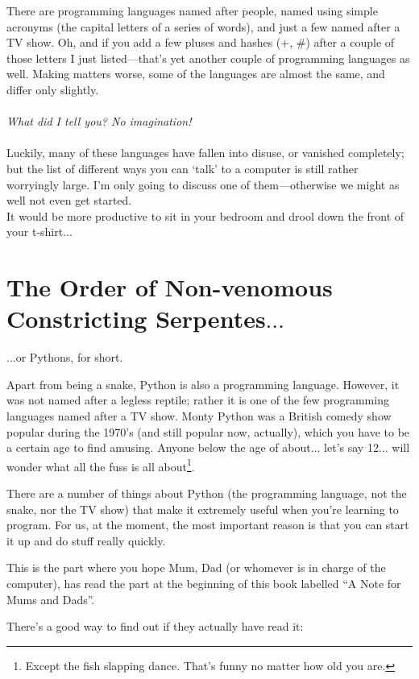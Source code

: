 There are programming languages named after people, named using simple acronyms (the capital letters of a series of words), and just a few named after a TV show.  Oh, and if you add a few pluses and hashes (+, \#) after a couple of those letters I just listed---that's yet another couple of programming languages as well.  Making matters worse, some of the languages are almost the same, and differ only slightly.
\\
\\
\emph{What did I tell you?  No imagination!}
\\
\\
Luckily, many of these languages have fallen into disuse, or vanished completely; but the list of different ways you can `talk' to a computer is still rather worryingly large.  I'm only going to discuss one of them---otherwise we might as well not even get started.
\\
It would be more productive to sit in your bedroom and drool down the front of your t-shirt$\ldots$

\section{The Order of Non-venomous\\Constricting Serpentes$\ldots$}

$\ldots$or Pythons, for short.

Apart from being a snake, Python is also a programming language.  However, it was not named after a legless reptile; rather it is one of the few programming languages named after a TV show.  Monty Python was a British comedy show popular during the 1970's (and still popular now, actually), which you have to be a certain age to find amusing.  Anyone below the age of about$\ldots$ let's say 12$\ldots$ will wonder what all the fuss is all about\footnote{Except the fish slapping dance.  That's funny no matter how old you are.}.

There are a number of things about Python (the programming language, not the snake, nor the TV show) that make it extremely useful when you're learning to program.  For us, at the moment, the most important reason is that you can start it up and do stuff really quickly.

This is the part where you hope Mum, Dad (or whomever is in charge of the computer), has read the part at the beginning of this book labelled ``A Note for Mums and Dads''.

\noindent
There's a good way to find out if they actually have read it:

